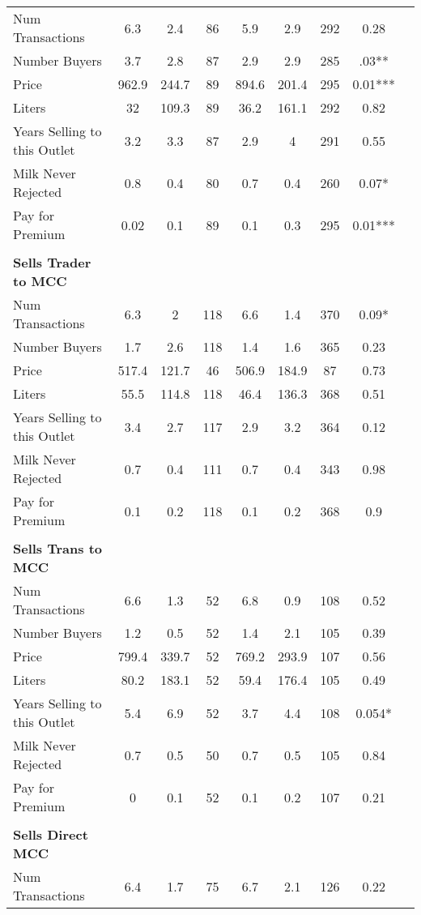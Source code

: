 \documentclass[11pt,letter,draft]{article}
\begin{document}
\begin{table}[ht]
{\begin{tabular}{l*{1}{cccccccc}}
Num Transactions&  6.3&  2.4&  86&  5.9&  2.9&  292&  0.28   \\
Number Buyers&  3.7&  2.8&  87&  2.9&  2.9&  285&  .03**   \\
Price&  962.9&  244.7&  89&  894.6&  201.4&  295&  0.01***   \\
Liters&  32&  109.3&  89&  36.2&  161.1&  292&  0.82   \\
Years Selling to this Outlet&  3.2&  3.3&  87&  2.9&  4&  291&  0.55   \\
Milk Never Rejected&  0.8&  0.4&  80&  0.7&  0.4&  260&  0.07*   \\
Pay for Premium&  0.02&  0.1&  89&  0.1&  0.3&  295&  0.01***   \\
 \\
\textbf{Sells Trader to MCC }&  &  &  &  &  &  &     \\
Num Transactions&  6.3&  2&  118&  6.6&  1.4&  370&  0.09*   \\
Number Buyers&  1.7&  2.6&  118&  1.4&  1.6&  365&  0.23   \\
Price&  517.4&  121.7&  46&  506.9&  184.9&  87&  0.73   \\
Liters&  55.5&  114.8&  118&  46.4&  136.3&  368&  0.51   \\
Years Selling to this Outlet&  3.4&  2.7&  117&  2.9&  3.2&  364&  0.12   \\
Milk Never Rejected&  0.7&  0.4&  111&  0.7&  0.4&  343&  0.98   \\
Pay for Premium&  0.1&  0.2&  118&  0.1&  0.2&  368&  0.9   \\
  \\
\textbf{Sells Trans to MCC} \\
Num Transactions&  6.6&  1.3&  52&  6.8&  0.9&  108&  0.52   \\
Number Buyers&  1.2&  0.5&  52&  1.4&  2.1&  105&  0.39   \\
Price&  799.4&  339.7&  52&  769.2&  293.9&  107&  0.56   \\
Liters&  80.2&  183.1&  52&  59.4&  176.4&  105&  0.49   \\
Years Selling to this Outlet&  5.4&  6.9&  52&  3.7&  4.4&  108&  0.054*   \\
Milk Never Rejected&  0.7&  0.5&  50&  0.7&  0.5&  105&  0.84   \\
Pay for Premium&  0&  0.1&  52&  0.1&  0.2&  107&  0.21   \\
    \\
\textbf{Sells Direct MCC}  \\
Num Transactions&  6.4&  1.7&  75&  6.7&  2.1&  126&  0.22   \\

\end{tabular}}
\end{table}
\end{document}
